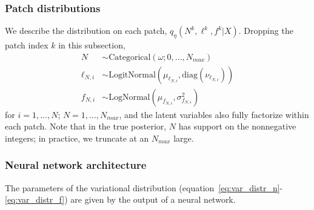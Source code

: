 \subsubsection{Patch distributions}
We describe the distribution on each patch, $q_\eta(N^k, \ell^k, f^k | X)$. 
Dropping the patch index $k$ in this subsection,
\begin{align*}
    N &\sim \text{Categorical}(\omega; 0, ..., N_{max}) \label{eq:var_distr_n}\\
	\ell_{N, i} &\sim \text{LogitNormal}(\mu_{\ell_{N, i}}, \text{diag}(\nu_{\ell_{N, i}}) )\label{eq:var_distr_loc}\\
	f_{N, i} &\sim \text{LogNormal}(\mu_{f_{N, i}}, \sigma^2_{f_{N, i}}) \label{eq:var_distr_f}
\end{align*}
for $i = 1, ..., N$; $N = 1, ..., N_{max}$, and the latent variables also fully factorize within each patch. Note that in the true posterior, $N$ has support on the nonnegative integers; in practice, we truncate at an $N_{max}$ large. 

\subsubsection{Neural network architecture}
The parameters of the variational distribution (equation~\ref{eq:var_distr_n}-\ref{eq:var_distr_f}) are given by the output of a 
neural network. 

